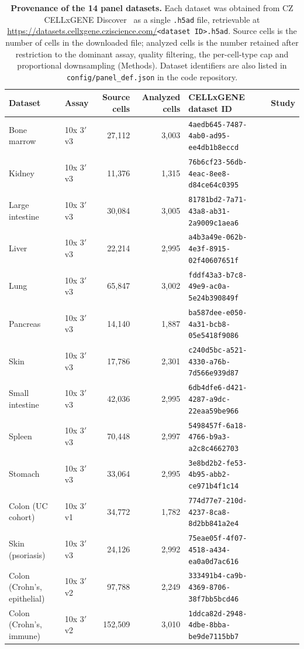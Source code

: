\begin{table}[htbp]
\centering
\caption{\textbf{Provenance of the 14 panel datasets.} Each dataset was obtained from CZ CELLxGENE Discover~\cite{cellxgene2025} as a single \texttt{.h5ad} file, retrievable at \url{https://datasets.cellxgene.cziscience.com/}\texttt{<dataset ID>}\texttt{.h5ad}. Source cells is the number of cells in the downloaded file; analyzed cells is the number retained after restriction to the dominant assay, quality filtering, the per-cell-type cap and proportional downsampling (Methods). Dataset identifiers are also listed in \texttt{config/panel\_def.json} in the code repository.}
\label{tab:s6}
\scriptsize
\setlength{\tabcolsep}{4pt}
\begin{tabular}{@{}llrrll@{}}
\toprule
Dataset & Assay & Source cells & Analyzed cells & CELLxGENE dataset ID & Study \\
\midrule
Bone marrow & 10x 3$'$ v3 & 27,112 & 3,003 & \texttt{4aedb645-7487-4ab0-ad95-ee4db1b8eccd} & \cite{tabula} \\
Kidney & 10x 3$'$ v3 & 11,376 & 1,315 & \texttt{76b6cf23-56db-4eac-8ee8-d84ce64c0395} & \cite{tabula} \\
Large intestine & 10x 3$'$ v3 & 30,084 & 3,005 & \texttt{81781bd2-7a71-43a8-ab31-2a9009c1aea6} & \cite{tabula} \\
Liver & 10x 3$'$ v3 & 22,214 & 2,995 & \texttt{a4b3a49e-062b-4e3f-8915-02f40607651f} & \cite{tabula} \\
Lung & 10x 3$'$ v3 & 65,847 & 3,002 & \texttt{fddf43a3-b7c8-49e9-ac0a-5e24b390849f} & \cite{tabula} \\
Pancreas & 10x 3$'$ v3 & 14,140 & 1,887 & \texttt{ba587dee-e050-4a31-bcb8-05e5418f9086} & \cite{tabula} \\
Skin & 10x 3$'$ v3 & 17,786 & 2,301 & \texttt{c240d5bc-a521-4330-a76b-7d566e939d87} & \cite{tabula} \\
Small intestine & 10x 3$'$ v3 & 42,036 & 2,995 & \texttt{6db4dfe6-d421-4287-a9dc-22eaa59be966} & \cite{tabula} \\
Spleen & 10x 3$'$ v3 & 70,448 & 2,997 & \texttt{5498457f-6a18-4766-b9a3-a2c8c4662703} & \cite{tabula} \\
Stomach & 10x 3$'$ v3 & 33,064 & 2,995 & \texttt{3e8bd2b2-fe53-4b95-abb2-ce971b4f1c14} & \cite{tabula} \\
\midrule
Colon (UC cohort) & 10x 3$'$ v1 & 34,772 & 1,782 & \texttt{774d77e7-210d-4237-8ca8-8d2bb841a2e4} & \cite{smillie2019} \\
Skin (psoriasis) & 10x 3$'$ v3 & 24,126 & 2,992 & \texttt{75eae05f-4f07-4518-a434-ea0a0d7ac616} & \cite{gao2021pso} \\
Colon (Crohn's, epithelial) & 10x 3$'$ v2 & 97,788 & 2,249 & \texttt{333491b4-ca9b-4369-8706-38f7bb5bcd46} & \cite{kong2023} \\
Colon (Crohn's, immune) & 10x 3$'$ v2 & 152,509 & 3,010 & \texttt{1ddca82d-2948-4dbe-8bba-be9de7115bb7} & \cite{kong2023} \\
\bottomrule
\end{tabular}
\end{table}
